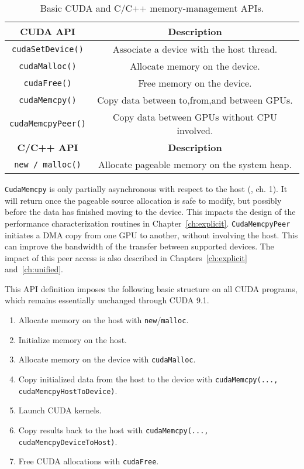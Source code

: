 \begin{table}[ht]
	\centering
	\caption[Basic memory-management APIs]{
		Basic CUDA and C/C++ memory-management APIs.
	}
	\label{tab:cuda-basic-apis}
	\begin{tabular}{cc}
		\hline
		\textbf{CUDA API}          & \textbf{Description}                         \\ \hline
		\texttt{cudaSetDevice()}   & Associate a device with the host thread.     \\ \hline
		\texttt{cudaMalloc()}      & Allocate memory on the device.               \\ \hline
		\texttt{cudaFree()}        & Free memory on the device.                   \\ \hline
		\texttt{cudaMemcpy()}      & Copy data between to,from,and between GPUs.  \\ \hline
		\texttt{cudaMemcpyPeer()}  & Copy data between GPUs without CPU involved. \\ \hline
		\hline 
		\textbf{C/C++ API}         & \textbf{Description}                         \\ \hline
		\texttt{new / malloc()}    & Allocate pageable memory on the system heap. \\ \hline
	\end{tabular}
\end{table}

\texttt{CudaMemcpy} is only partially asynchronous with respect to the host (\cite{nvidia2014cuda60runtime}, ch. 1).
It will return once the pageable source allocation is safe to modify, but possibly before the data has finished moving to the device.
This impacts the design of the performance characterization routines in Chapter~\ref{ch:explicit}.
\texttt{CudaMemcpyPeer} initiates a DMA copy from one GPU to another, without involving the host.
This can improve the bandwidth of the transfer between supported devices.
The impact of this peer access is also described in Chapters~\ref{ch:explicit} and~\ref{ch:unified}.

This API definition imposes the following basic structure on all CUDA programs, which remains essentially unchanged through CUDA 9.1.
\begin{enumerate}
	\item Allocate memory on the host with \texttt{new}/\texttt{malloc}.
	\item Initialize memory on the host.
	\item Allocate memory on the device with \texttt{cudaMalloc}.
	\item Copy initialized data from the host to the device with 
	\newline \texttt{cudaMemcpy(..., cudaMemcpyHostToDevice)}.
	\item Launch CUDA kernels.
	\item Copy results back to the host with \texttt{cudaMemcpy(...,} 
	\newline \texttt{cudaMemcpyDeviceToHost)}.
	\item Free CUDA allocations with \texttt{cudaFree}.
\end{enumerate}

